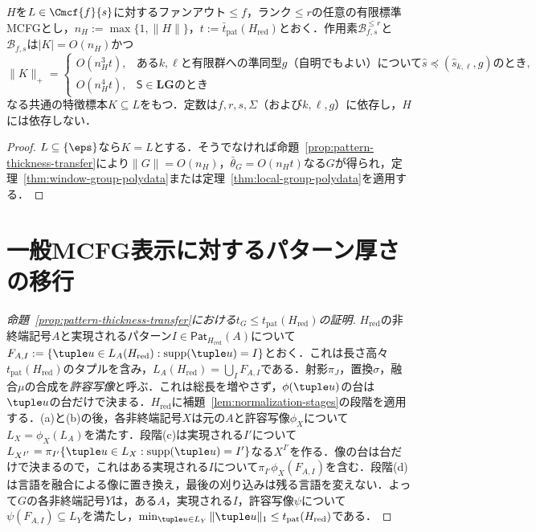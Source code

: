 \begin{corollary}[任意の標準MCFGからの特徴データ総長]
\label{cor:unrestricted-standard-mcfg-data}
$H$を$L\in\Cmcf{f}{s}$に対するファンアウト$\le f$，ランク$\le r$の任意の有限標準MCFGとし，$n_H:=\max\{1,\|H\|\}$，$t:=\bar t_{\mathrm{pat}}(H_{\mathrm{red}})$とおく．作用素$\mathcal B^{\le r}_{f,s}$と$\mathcal B_{f,s}$は$|K|=O(n_H)$かつ
\[
 \|K\|_+=
 \begin{cases}
 O(n_H^3t),&\text{ある}k,\ell\text{と有限群への準同型}g\text{（自明でもよい）について}\widehat s\preceq(\widehat s_{k,\ell},g)\text{のとき},\\
 O(n_H^4t),&\mathsf S\in\mathbf{LG}\text{のとき}
 \end{cases}
\]
なる共通の特徴標本$K\subseteq L$をもつ．定数は$f,r,s,\Sigma$（および$k,\ell,g$）に依存し，$H$には依存しない．
\end{corollary}

\begin{proof}
$L\subseteq\{\eps\}$なら$K=L$とする．そうでなければ命題~\ref{prop:pattern-thickness-transfer}により$\|G\|=O(n_H)$，$\bar\theta_G=O(n_Ht)$なる$G$が得られ，定理~\ref{thm:window-group-polydata}または定理~\ref{thm:local-group-polydata}を適用する．
\end{proof}


\section{一般MCFG表示に対するパターン厚さの移行}
\label{app:pattern-thickness}

\begin{proof}[命題~\ref{prop:pattern-thickness-transfer}における$t_G\le t_{\mathrm{pat}}(H_{\mathrm{red}})$の証明]
$H_{\mathrm{red}}$の非終端記号$A$と実現されるパターン$I\in\mathsf{Pat}_{H_{\mathrm{red}}}(A)$について$F_{A,I}:=\{\tuple u\in L_A(H_{\mathrm{red}}):\operatorname{supp}(\tuple u)=I\}$とおく．これは長さ高々$t_{\mathrm{pat}}(H_{\mathrm{red}})$のタプルを含み，$L_A(H_{\mathrm{red}})=\bigcup_IF_{A,I}$である．射影$\pi_J$，置換$\sigma$，融合$\mu$の合成を\emph{許容写像}と呼ぶ．これは総長を増やさず，$\phi(\tuple u)$の台は$\tuple u$の台だけで決まる．$H_{\mathrm{red}}$に補題~\ref{lem:normalization-stages}の段階を適用する．(a)と(b)の後，各非終端記号$X$は元の$A$と許容写像$\phi_X$について$L_X=\phi_X(L_A)$を満たす．段階(c)は実現される$I'$について$L_{X^{I'}}=\pi_{I'}\{\tuple u\in L_X:\operatorname{supp}(\tuple u)=I'\}$なる$X^{I'}$を作る．像の台は台だけで決まるので，これはある実現される$I$について$\pi_{I'}\phi_X(F_{A,I})$を含む．段階(d)は言語を融合による像に置き換え，最後の刈り込みは残る言語を変えない．よって$G$の各非終端記号$Y$は，ある$A$，実現される$I$，許容写像$\psi$について$\psi(F_{A,I})\subseteq L_Y$を満たし，$\min_{\tuple u\in L_Y}\|\tuple u\|_1\le t_{\mathrm{pat}}(H_{\mathrm{red}})$である．
\end{proof}

